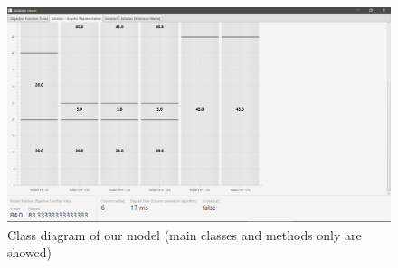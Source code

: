 \documentclass[10pt,a4paper]{article}
\begin{document}
\begin{figure}[H]
\includegraphics[width=\textwidth]{./images/solgraphic.png}
\centering
\caption{Class diagram of our model (main classes and methods only are showed)}

\end{figure}
\end{document}
